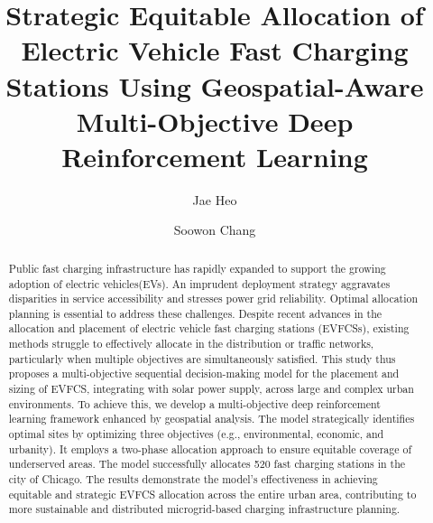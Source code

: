\documentclass[preprint,12pt]{elsarticle}
\begin{document}
\begin{frontmatter}



\title{Strategic Equitable Allocation of Electric Vehicle Fast Charging Stations Using Geospatial-Aware Multi-Objective Deep Reinforcement Learning} %

\author[1]{Jae Heo}
\author[1]{Soowon Chang\corref{*}}

\begin{abstract}
Public fast charging infrastructure has rapidly expanded to support the growing adoption of electric vehicles(EVs). An imprudent deployment strategy aggravates disparities in service accessibility and stresses power grid reliability. Optimal allocation planning is essential to address these challenges. Despite recent advances in the allocation and placement of electric vehicle fast charging stations (EVFCSs), existing methods struggle to effectively allocate in the distribution or traffic networks, particularly when multiple objectives are simultaneously satisfied. This study thus proposes a multi-objective sequential decision-making model for the placement and sizing of EVFCS, integrating with solar power supply, across large and complex urban environments. To achieve this, we develop a multi-objective deep reinforcement learning framework enhanced by geospatial analysis. The model strategically identifies optimal sites by optimizing three objectives (e.g., environmental, economic, and urbanity). It employs a two-phase allocation approach to ensure equitable coverage of underserved areas. The model successfully allocates 520 fast charging stations in the city of Chicago. The results demonstrate the model's effectiveness in achieving equitable and strategic EVFCS allocation across the entire urban area, contributing to more sustainable and distributed microgrid-based charging infrastructure planning. 
\end{abstract}



\end{frontmatter}
\end{document}
